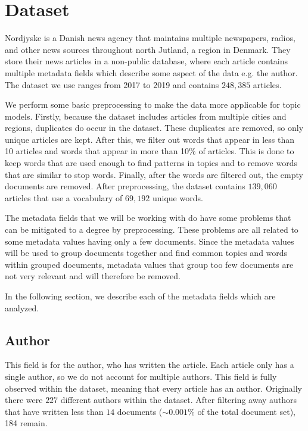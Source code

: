 \section{Dataset}\label{sec:dataset}
Nordjyske is a Danish news agency that maintains multiple newspapers, radios, and other news sources throughout north Jutland, a region in Denmark.
They store their news articles in a non-public database, where each article contains multiple metadata fields which describe some aspect of the data e.g. the author.
The dataset we use ranges from 2017 to 2019 and contains $248,385$ articles.

We perform some basic preprocessing to make the data more applicable for topic models.
Firstly, because the dataset includes articles from multiple cities and regions, duplicates do occur in the dataset.
These duplicates are removed, so only unique articles are kept.
After this, we filter out words that appear in less than 10 articles and words that appear in more than 10$\%$ of articles.
This is done to keep words that are used enough to find patterns in topics and to remove words that are similar to stop words.
Finally, after the words are filtered out, the empty documents are removed.
After preprocessing, the dataset contains $139,060$ articles that use a vocabulary of $69,192$ unique words.

The metadata fields that we will be working with do have some problems that can be mitigated to a degree by preprocessing.
These problems are all related to some metadata values having only a few documents.
Since the metadata values will be used to group documents together and find common topics and words within grouped documents, metadata values that group too few documents are not very relevant and will therefore be removed.

In the following section, we describe each of the metadata fields which are analyzed.

\subsection{Author}
This field is for the author, who has written the article.
Each article only has a single author, so we do not account for multiple authors.
This field is fully observed within the dataset, meaning that every article has an author.
Originally there were $227$ different authors within the dataset.
After filtering away authors that have written less than $14$ documents (${\sim}0.001\%$ of the total document set), 184 remain.

